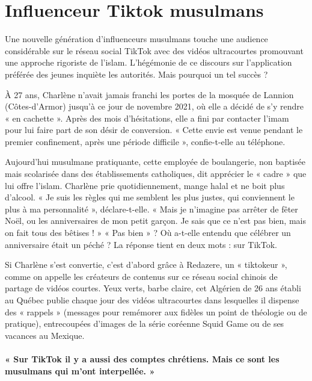 \section{Influenceur Tiktok musulmans}


Une nouvelle génération d’influenceurs musulmans touche une audience considérable sur le réseau social TikTok avec des vidéos ultracourtes promouvant une approche rigoriste de l’islam. L’hégémonie de ce discours sur l’application préférée des jeunes inquiète les autorités. Mais pourquoi un tel succès ?
 
À 27 ans, Charlène n’avait jamais franchi les portes de la mosquée de Lannion (Côtes-d’Armor) jusqu’à ce jour de novembre 2021, où elle a décidé de s’y rendre « en cachette ». Après des mois d’hésitations, elle a fini par contacter l’imam pour lui faire part de son désir de conversion. « Cette envie est venue pendant le premier confinement, après une période difficile », confie-t-elle au téléphone.

Aujourd’hui musulmane pratiquante, cette employée de boulangerie, non baptisée mais scolarisée dans des établissements catholiques, dit apprécier le « cadre » que lui offre l’islam. Charlène prie quotidiennement, mange halal et ne boit plus d’alcool. « Je suis les règles qui me semblent les plus justes, qui conviennent le plus à ma personnalité », déclare-t-elle. « Mais je n’imagine pas arrêter de fêter Noël, ou les anniversaires de mon petit garçon. Je sais que ce n’est pas bien, mais on fait tous des bêtises ! » « Pas bien » ? Où a-t-elle entendu que célébrer un anniversaire était un péché ? La réponse tient en deux mots : sur TikTok.
 

Si Charlène s’est convertie, c’est d’abord grâce à Redazere, un « tiktokeur », comme on appelle les créateurs de contenus sur ce réseau social chinois de partage de vidéos courtes. Yeux verts, barbe claire, cet Algérien de 26 ans établi au Québec publie chaque jour des vidéos ultracourtes dans lesquelles il dispense des « rappels » (messages pour remémorer aux fidèles un point de théologie ou de pratique), entrecoupées d’images de la série coréenne Squid Game ou de ses vacances au Mexique.

\paragraph{« Sur TikTok il y a aussi des comptes chrétiens. Mais ce sont les musulmans qui m’ont interpellée. »}

